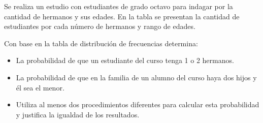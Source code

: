 \ejemplo

Se realiza un estudio con estudiantes de grado octavo para indagar por la cantidad de hermanos y sus edades. En la tabla se presentan la cantidad de estudiantes por cada número de hermanos y rango de edades.


Con base en la tabla de distribución de frecuencias determina:

\begin{itemize}
  \item La probabilidad de que un estudiante del curso tenga 1 o 2 hermanos.
  \item La probabilidad de que en la familia de un alumno del curso haya dos hijos y él sea el menor.
  \item Utiliza al menos dos procedimientos diferentes para calcular esta probabilidad y justifica la igualdad de los resultados.
\end{itemize}

